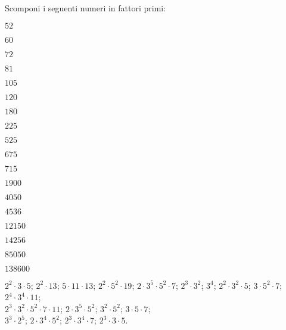 \begin{esercizio}
Scomponi i seguenti numeri in fattori primi:
\begin{htmulticols}{6}
\begin{enumeratees}
\item \(52\)       %
\item \(60\)       %
\item \(72\)       %
\item \(81\)       %
\item \(105\)      %
\item \(120\)      %
\item \(180\)      %
\item \(225\)      %
\item \(525\)      %
\item \(675\)      %
\item \(715\)      %
\item \(1900\)     %
\item \(4050\)     %
\item \(4536\)     %
\item \(12150\)    %
\item \(14256\)    %
\item \(85050\)    %
\item \(138600\)   %
\end{enumeratees}
\end{htmulticols}
\noindent\! \(2^2 \cdot 3 \cdot 5\); \quad 
{} \(2^2 \cdot 13\); \quad 
{} \(5 \cdot 11 \cdot 13\); \quad 
{} \(2^2 \cdot 5^2 \cdot 19\); \quad 
{} \(2 \cdot 3^5 \cdot 5^2 \cdot 7\); \quad 
{} \(2^3 \cdot 3^2\); \quad 
{} \(3^4\); \quad 
{} \(2^2 \cdot 3^2 \cdot 5\); \quad 
{} \(3 \cdot 5^2 \cdot 7\); \quad 
{} \(2^4 \cdot 3^4 \cdot 11\); \\
 \(2^3 \cdot 3^2 \cdot 5^2 \cdot 7 \cdot 11\); \quad
{} \(2 \cdot 3^5 \cdot 5^2\); 
{} \(3^2 \cdot 5^2\); \quad 
{} \(3 \cdot 5 \cdot 7\); \\
 \(3^3 \cdot 2^5\);\quad 
{} \(2 \cdot 3^4 \cdot 5^2\); \quad 
{} \(2^3 \cdot 3^4 \cdot 7\); \quad 
{} \(2^3 \cdot 3 \cdot 5\). 
\end{esercizio}

